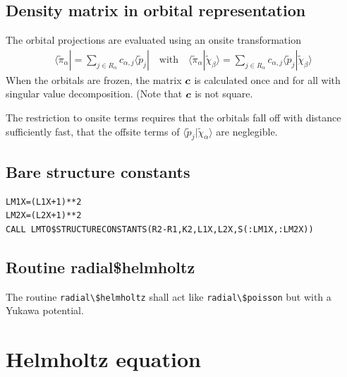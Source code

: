 \documentclass[11pt,a4paper]{report}
\begin{document}
\subsection{Density matrix in orbital representation}
The orbital projections are evaluated using an onsite transformation
\begin{eqnarray}
\langle\tilde{\pi}_\alpha|=\sum_{j\in R_\alpha} c_{\alpha,j}\langle\tilde{p}_j|
\quad\text{with}\quad
\langle\tilde{\pi}_\alpha|\tilde{\chi}_\beta\rangle
=\sum_{j\in R_\alpha} c_{\alpha,j}\langle\tilde{p}_j|\tilde{\chi}_\beta\rangle
\end{eqnarray}
When the orbitals are frozen, the matrix $\bm{c}$ is calculated once
and for all with singular value decomposition. (Note that $\bm{c}$ is
not square.

The restriction to onsite terms requires that the orbitals fall off
with distance sufficiently fast, that the offsite terms of
$\langle\tilde{p}_j|\tilde\chi_\alpha\rangle$ are neglegible.

\subsection{Bare structure constants}

\begin{verbatim}
LM1X=(L1X+1)**2
LM2X=(L2X+1)**2
CALL LMTO$STRUCTURECONSTANTS(R2-R1,K2,L1X,L2X,S(:LM1X,:LM2X))
\end{verbatim}



\subsection{Routine radial\$helmholtz}
The routine \verb|radial\$helmholtz| shall act like
\verb|radial\$poisson| but with a Yukawa potential.



\newpage
\section{Helmholtz equation}
\end{document}
